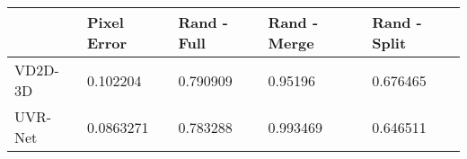 \begin{tabular}{lllll}
\toprule
{} & Pixel Error & Rand - Full & Rand - Merge & Rand - Split \\
\midrule
VD2D-3D &    0.102204 &    0.790909 &      0.95196 &     0.676465 \\
UVR-Net &   0.0863271 &    0.783288 &     0.993469 &     0.646511 \\
\bottomrule
\end{tabular}
